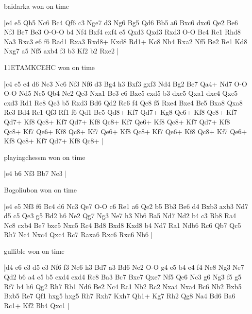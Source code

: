 \showboard

baidarka won on time

\makegametitle
|e4 e5 Qh5 Nc6 Bc4 Qf6 c3 Nge7 d3 Ng6 Bg5 Qd6 Bb5 a6 Bxc6 dxc6 Qe2 Be6 Nf3 Be7 Be3 O-O-O b4 Nf4 Bxf4 exf4 e5 Qxd3 Qxd3 Rxd3 O-O Bc4 Re1 Rhd8 Na3 Rxc3 e6 f6 Rad1 Rxa3 Rxd8+ Kxd8 Rd1+ Kc8 Nh4 Rxa2 Nf5 Be2 Re1 Kd8 Nxg7 a5 Nf5 axb4 f3 b3 Kf2 b2 Rxe2  |

\showboard

11ETAMKCEHC won on time

\makegametitle
|c4 e5 e4 d6 Nc3 Nc6 Nf3 Nf6 d3 Bg4 h3 Bxf3 gxf3 Nd4 Bg2 Be7 Qa4+ Nd7 O-O O-O Nd5 Nc5 Qb4 Nc2 Qc3 Nxa1 Be3 c6 Bxc5 cxd5 b3 dxc5 Qxa1 dxc4 Qxe5 cxd3 Rd1 Re8 Qc3 b5 Rxd3 Bd6 Qd2 Re6 f4 Qe8 f5 Rxe4 Bxe4 Be5 Bxa8 Qxa8 Re3 Bd4 Re1 Qf3 Rf1 f6 Qd1 Be5 Qd8+ Kf7 Qd7+ Kg8 Qe6+ Kf8 Qc8+ Kf7 Qd7+ Kf8 Qc8+ Kf7 Qd7+ Kf8 Qc8+ Kf7 Qe6+ Kf8 Qc8+ Kf7 Qd7+ Kf8 Qc8+ Kf7 Qe6+ Kf8 Qc8+ Kf7 Qe6+ Kf8 Qc8+ Kf7 Qe6+ Kf8 Qc8+ Kf7 Qe6+ Kf8 Qc8+ Kf7 Qd7+ Kf8 Qc8+  |

\showboard

playingchessm won on time

\makegametitle
|e4 b6 Nf3 Bb7 Nc3  |

\showboard

Bogoliubon won on time

\makegametitle
|e4 e5 Nf3 f6 Bc4 d6 Nc3 Qe7 O-O c6 Re1 a6 Qe2 b5 Bb3 Be6 d4 Bxb3 axb3 Nd7 d5 c5 Qe3 g5 Bd2 h6 Ne2 Qg7 Ng3 Ne7 h3 Nb6 Ba5 Nd7 Nd2 b4 c3 Rb8 Ra4 Nc8 cxb4 Be7 bxc5 Nxc5 Rc4 Bd8 Bxd8 Kxd8 b4 Nd7 Ra1 Ndb6 Rc6 Qb7 Qc5 Rh7 Nc4 Nxc4 Qxc4 Rc7 Raxa6 Rxc6 Rxc6 Nb6  |

\showboard

gullible won on time

\makegametitle
|d4 e6 c3 d5 e3 Nf6 f3 Nc6 h3 Bd7 a3 Bd6 Ne2 O-O g4 e5 b4 e4 f4 Ne8 Ng3 Ne7 Qd2 b6 a4 c5 b5 cxd4 cxd4 Rc8 Ba3 Bc7 Bxe7 Qxe7 Nf5 Qe6 Nc3 g6 Ng3 f5 g5 Rf7 h4 h6 Qg2 Rh7 Rb1 Nd6 Be2 Nc4 Rc1 Nb2 Rc2 Nxa4 Nxa4 Bc6 Nb2 Bxb5 Bxb5 Re7 Qf1 hxg5 hxg5 Rh7 Rxh7 Kxh7 Qh1+ Kg7 Rh2 Qg8 Na4 Bd6 Ba6 Rc1+ Kf2 Bb4 Qxc1  |

\showboard

